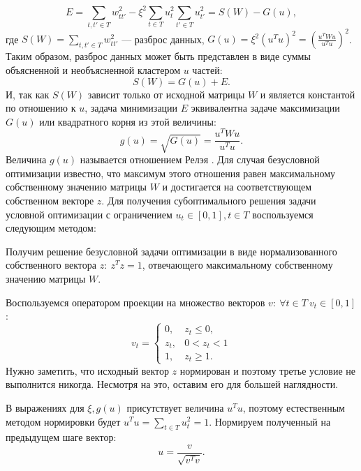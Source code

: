 \documentclass[12pt]{article}
\newenvironment{enumerate*}%
{\begin{enumerate}%
	\setlength{\itemsep}{0pt}%
	\setlength{\parskip}{0pt}}%
{\end{enumerate}}
\begin{document}
\begin{equation}
	E = \sum_{t,t'\in T}w_{tt'}^2-\xi^2 \sum_{t\in T}u_t^2 \sum_{t'\in T}u_{t'}^2 = S(W) - G(u),
\end{equation}
где $S(W)=\sum_{t,t'\in T}w_{tt'}^2$ --- разброс данных, $G(u) = \xi^2 (u^Tu)^2= \left(\frac{u^TWu}{u^Tu}\right)^2$. Таким образом, разброс данных может быть представлен в виде суммы объясненной и необъясненной кластером $u$ частей:
\begin{equation}
	S(W)=G(u)+E.
\end{equation}
И, так как $S(W)$ зависит только от исходной матрицы $W$ и является константой по отношению к $u$, задача минимизации $E$ эквивалентна задаче максимизации $G(u)$ или квадратного корня из этой величины:
\begin{equation}
	g(u)=\sqrt{G(u)} = \frac{u^TWu}{u^Tu}.
	\label{eq:rayleigh}
\end{equation}
Величина  $g(u)$ называется отношением Релэя \cite{parlett1998symmetric}. Для случая безусловной оптимизации известно, что максимум этого отношения равен максимальному собственному значению матрицы $W$ и достигается на соответствующем собственном векторе $z$. Для получения субоптимального решения задачи условной оптимизации с ограничением $u_t\in[0, 1], t\in T$ воспользуемся следующим методом:
\begin{enumerate*}
	\item Получим решение безусловной задачи оптимизации в виде нормализованного собственного вектора $z:\ z^Tz=1$, отвечающего максимальному собственному значению матрицы $W$.
	\item Воспользуемся оператором проекции на множество векторов ${v:\ \forall t\in T\ v_t\in[0, 1]}$:
	\begin{equation}
		v_t =\begin{cases}
		0, & z_t \leq 0,\\
		z_t, & 0<z_t<1\\
		1, & z_t\geq 1.
		\end{cases}
	\end{equation}
	Нужно заметить, что исходный вектор $z$ нормирован и поэтому третье условие не выполнится никогда. Несмотря на это, оставим его для большей наглядности.
	\item В выражениях для $\xi, g(u)$ присутствует величина $u^Tu$, поэтому естественным методом нормировки будет $u^Tu=\sum_{t\in T} u_t^2=1$. Нормируем полученный на предыдущем шаге вектор:
	\begin{equation}
		u = \frac{v}{\sqrt{v^Tv}}.
	\end{equation}
\end{enumerate*}
\end{document}
